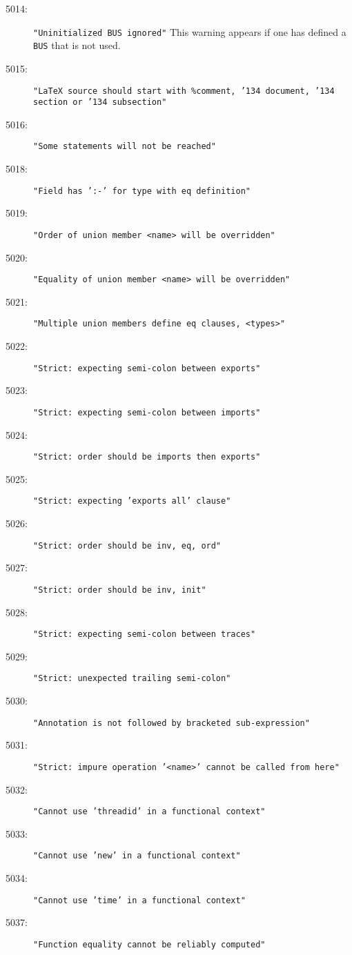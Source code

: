 \begin{description}
\item[5014:] \texttt{"Uninitialized BUS ignored"}  This warning appears
  if one has defined a \texttt{BUS} that is not used.
\item[5015:] \texttt{"LaTeX source should start with \%comment,
  \char'134 document, \char'134 section or \char'134 subsection"  }
\item[5016:] \texttt{"Some statements will not be reached"}
\item[5018:] \texttt{"Field has ':-' for type with eq definition"}
\item[5019:] \texttt{"Order of union member <name> will be overridden"}
\item[5020:] \texttt{"Equality of union member <name> will be overridden"}
\item[5021:] \texttt{"Multiple union members define eq clauses, <types>"}
\item[5022:] \texttt{"Strict: expecting semi-colon between exports"}
\item[5023:] \texttt{"Strict: expecting semi-colon between imports"}
\item[5024:] \texttt{"Strict: order should be imports then exports"}
\item[5025:] \texttt{"Strict: expecting 'exports all' clause"}
\item[5026:] \texttt{"Strict: order should be inv, eq, ord"}
\item[5027:] \texttt{"Strict: order should be inv, init"}
\item[5028:] \texttt{"Strict: expecting semi-colon between traces"}
\item[5029:] \texttt{"Strict: unexpected trailing semi-colon"}
\item[5030:] \texttt{"Annotation is not followed by bracketed sub-expression"}
\item[5031:] \texttt{"Strict: impure operation '<name>' cannot be called from here"}
\item[5032:] \texttt{"Cannot use 'threadid' in a functional context"}
\item[5033:] \texttt{"Cannot use 'new' in a functional context"}
\item[5034:] \texttt{"Cannot use 'time' in a functional context"}
\item[5037:] \texttt{"Function equality cannot be reliably computed"}

\end{description}
